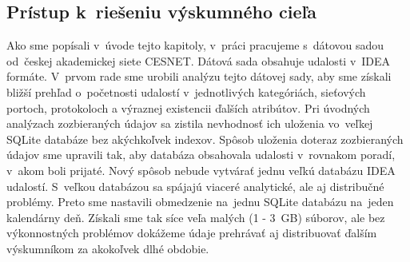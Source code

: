\documentclass[thesismargins, thesislinespacing, openright, upjsfrontpage]{rnthesis}
\begin{document}

\subsection{Prístup k~riešeniu výskumného cieľa} \label{c1_metodologia}

Ako sme popísali v~úvode tejto kapitoly, v~práci pracujeme s~dátovou sadou od~českej akademickej siete CESNET. Dátová sada obsahuje udalosti v~IDEA formáte. V~prvom rade sme urobili analýzu tejto dátovej sady, aby sme získali bližší prehľad o~početnosti udalostí v~jednotlivých kategóriách, sieťových portoch, protokoloch a výraznej existencii ďalších atribútov. Pri úvodných analýzach zozbieraných údajov sa zistila nevhodnosť ich uloženia vo~veľkej SQLite databáze bez akýchkoľvek indexov. Spôsob uloženia doteraz zozbieraných údajov sme upravili tak, aby databáza obsahovala udalosti v~rovnakom poradí, v~akom boli prijaté. Nový spôsob nebude vytvárať jednu veľkú databázu IDEA udalostí. S~veľkou databázou sa spájajú viaceré analytické, ale aj distribučné problémy. Preto sme nastavili obmedzenie na~jednu SQLite databázu na~jeden kalendárny deň. Získali sme tak síce veľa malých (1 - 3~GB) súborov, ale bez výkonnostných problémov dokážeme údaje prehrávať aj distribuovať ďalším výskumníkom za akokoľvek dlhé obdobie. 
\end{document}
